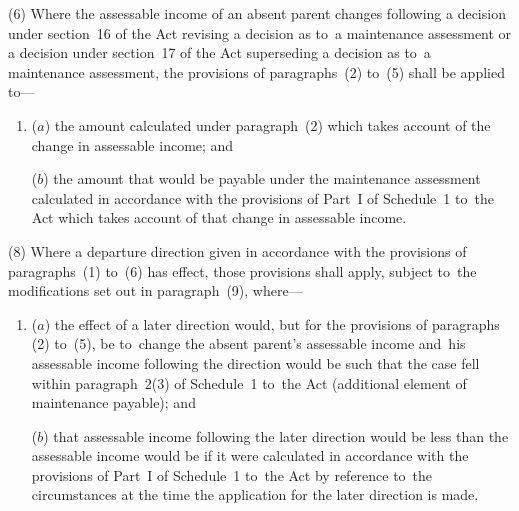 \documentclass[12pt,a4paper]{article}
\begin{document}
(6) Where the assessable income of an absent parent changes following 
a decision under section~16 of the Act revising a decision as to~a maintenance assessment or a decision under section~17 of the Act superseding a decision as to~a maintenance assessment,  %
the provisions of paragraphs~(2) to~(5) shall be applied to—
\begin{enumerate}\item[]
($a$) the amount calculated under paragraph~(2) which takes account of the change
in assessable income; and

($b$) the amount that would be payable under the maintenance assessment calculated
in accordance with the provisions of Part~I of Schedule~1 to~the Act which takes
account of that change in assessable income.
\end{enumerate}



(8) Where a departure direction given in accordance with the provisions of 
paragraphs~(1) to~(6)  %
has effect, those provisions shall apply, subject to~the modifications set out in paragraph~(9), where—
\begin{enumerate}\item[]
($a$) the effect of a later direction would, but for the provisions of paragraphs
(2) to~(5), be to~change the absent parent’s assessable income and~his
assessable income following the direction would be such that the case fell
within paragraph~2(3) of Schedule~1 to~the Act (additional element of
maintenance payable); and

($b$) that assessable income following the later direction would be less than the
assessable income would be if it were calculated in accordance with the
provisions of Part~I of Schedule~1 to~the Act by reference to~the circumstances
at the time the application for the later direction is made.
\end{enumerate}
\end{document}
